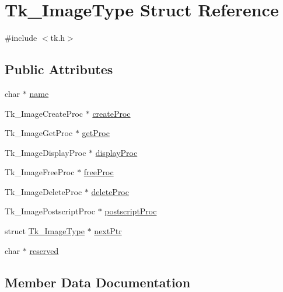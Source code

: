 \hypertarget{struct_tk___image_type}{}\section{Tk\+\_\+\+Image\+Type Struct Reference}
\label{struct_tk___image_type}


{\ttfamily \#include $<$tk.\+h$>$}

\subsection*{Public Attributes}
\begin{DoxyCompactItemize}
\item 
char $\ast$ \hyperlink{struct_tk___image_type_a8850ff18244023233df8c7e747cf5a88}{name}
\item 
Tk\+\_\+\+Image\+Create\+Proc $\ast$ \hyperlink{struct_tk___image_type_a2205b7ae3645184ace53ce24d171997a}{create\+Proc}
\item 
Tk\+\_\+\+Image\+Get\+Proc $\ast$ \hyperlink{struct_tk___image_type_ae798f195257d43c5c2245cb8b1f9eda1}{get\+Proc}
\item 
Tk\+\_\+\+Image\+Display\+Proc $\ast$ \hyperlink{struct_tk___image_type_a38087208acff84a804f0f16e80fe69e3}{display\+Proc}
\item 
Tk\+\_\+\+Image\+Free\+Proc $\ast$ \hyperlink{struct_tk___image_type_af1f13f7151296a83331f59f5bc47273d}{free\+Proc}
\item 
Tk\+\_\+\+Image\+Delete\+Proc $\ast$ \hyperlink{struct_tk___image_type_a2c3d348bf166f30f2ce600b6a0658dfb}{delete\+Proc}
\item 
Tk\+\_\+\+Image\+Postscript\+Proc $\ast$ \hyperlink{struct_tk___image_type_a6fc75c13b1aa0e721ead11b18cb5f4f3}{postscript\+Proc}
\item 
struct \hyperlink{struct_tk___image_type}{Tk\+\_\+\+Image\+Type} $\ast$ \hyperlink{struct_tk___image_type_abcc7ba7e2104e1b86c8ec7ef05d9aa36}{next\+Ptr}
\item 
char $\ast$ \hyperlink{struct_tk___image_type_a358fe063076b6d9b70966e5fc500c41f}{reserved}
\end{DoxyCompactItemize}


\subsection{Member Data Documentation}

